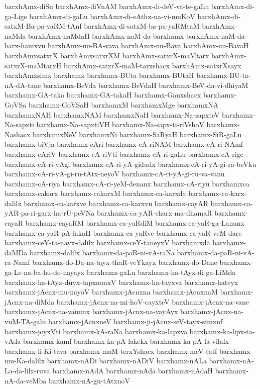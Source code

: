 {barxhAmx-diSu
barxhAmx-diVnAM
barxhAmx-di-deV-va-te-gaLu
barxhAmx-di-ga-Lige
barxhAmx-di-gaLu
barxhAmx-di-sAthx-na-vi-muKoV
barxhAmx-di-satxM-Ba-pa-yaRM-tAnf
barxhAmx-di-satxM-ba-pa-yaRMtaM
barxhAmx-naMda
barxhAmx-naMdaH
barxhAmx-naM-da-barxhamx
barxhAmx-naM-da-barx-hamxvu
barxhAmx-nu-BA-vava
barxhAmx-nu-Bava
barxhAmx-nu-BavaH
barxhAmxsatxrX
barxhAmxsatxrXM
barxhAmx-satxrX-maMtarx
barxhAmx-satxrX-maMtarxH
barxhAmx-satxrX-maM-tarxshacx
barxhAmx-satxrXsayx
barxhAmxsimx
barxhamx
barxhamx-BUta
barxhamx-BUtaH
barxhamx-BU-ta-nA-dA-tane
barxhamx-BeVda
barxhamx-BeVdaH
barxhamx-BeV-da-vi-dhiyaM
barxhamx-GA-taka
barxhamx-GA-takaH
barxhamx-Ganxshacx
barxhamx-GoVSa
barxhamx-GoVSaH
barxhamxM
barxhamxMge
barxhamxNA
barxhamxNAH
barxhamxNAM
barxhamxNaH
barxhamx-Na-sapxteV
barxhamx-Na-sapxti
barxhamx-Na-sapxtiVH
barxhamx-Na-sapx-ti-riVshoV
barxhamx-Nashacx
barxhamxNeV
barxhamxNi
barxhamx-SaRyaH
barxhamx-SiR-gaLu
barxhamx-biVja
barxhamx-cAri
barxhamx-cA-riNAM
barxhamx-cA-ri-NAmf
barxhamx-cAriV
barxhamx-cA-riVti
barxhamx-cA-ri-gaLu
barxhamx-cA-rige
barxhamx-cA-ri-yAgi
barxhamx-cA-ri-yA-gidudx
barxhamx-cA-ri-yA-gi-ra-beVku
barxhamx-cA-ri-yA-gi-ru-tAtx-neyoV
barxhamx-cA-ri-yA-gi-ru-va-vanu
barxhamx-cA-riya
barxhamx-cA-ri-yeM-denanx
barxhamx-cA-riyu
barxhamxca
barxhamx-cakarx
barxhamx-cakarxM
barxhamx-ca-karxda
barxhamx-ca-karx-dalilx
barxhamx-ca-karxve
barxhamx-ca-karxvu
barxhamx-cayAR
barxhamx-ca-yAR-pa-ri-garx-ha-rU-peVNa
barxhamx-ca-yAR-sharx-ma-dhamaR
barxhamx-cayaR
barxhamx-cayaRM
barxhamx-ca-yaRdiM
barxhamx-ca-yaR-ga-Lanunx
barxhamx-ca-yaR-pA-lakaH
barxhamx-ca-yaRve
barxhamx-ca-yaR-veM-dare
barxhamx-ceY-ta-nayx-dalilx
barxhamx-ceY-taneyxV
barxhamxda
barxhamx-daMDa
barxhamx-dalilx
barxhamx-da-paR-ni-vA-raNa
barxhamx-da-paR-ni-vA-ra-Namf
barxhamx-do-Da-na-tayx-thaR-veYkayx
barxhamx-do-Dane
barxhamx-ga-Le-na-ba-hu-do-nayayx
barxhamx-gaLu
barxhamx-ha-tAyx-di-ga-LiMda
barxhamx-ha-tAyx-duyx-tapxnonxV
barxhamx-ha-tayxva
barxhamx-hateyx
barxhamx-jAcnx-mu-nayoV
barxhamx-jAcnxna
barxhamx-jAcnxnaM
barxhamx-jAcnx-na-diMda
barxhamx-jAcnx-na-mi-hoV-cayxteV
barxhamx-jAcnx-na-vane
barxhamx-jAcnx-na-vanunx
barxhamx-jAcnx-na-vayAyx
barxhamx-jAcnx-na-vuM-TA-galu
barxhamx-jAcnxneV
barxhamx-ji-jAcnx-seV-tayx-simxnf
barxhamx-joyxVti
barxhamx-kA-raNa
barxhamx-ka-lapxva
barxhamx-ka-lipx-ta-vAda
barxhamx-kamf
barxhamx-ka-pA-lakekx
barxhamx-ka-pA-la-vilalx
barxhamx-li-Ki-tava
barxhamx-maM-terxYshacx
barxhamx-meV-tatf
barxhamx-mu-Ka-dalilx
barxhamx-nADi
barxhamx-nADiV
barxhamx-nALa
barxhamx-nA-La-da-lilx-ruva
barxhamx-nAdA
barxhamx-nAda
barxhamx-nAdaH
barxhamx-nA-da-veMba
barxhamx-nA-gu-tAtxnoV
}
